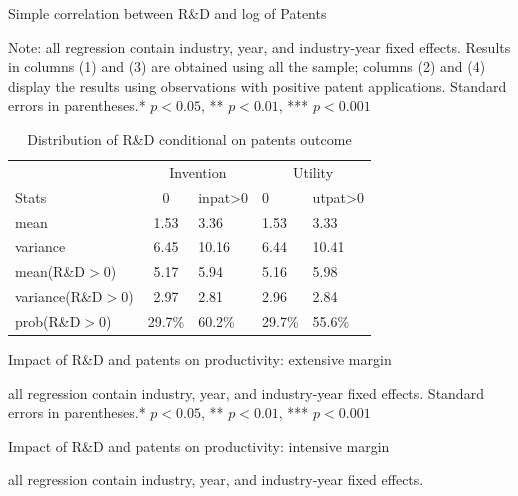 \documentclass[english]{article}
\begin{document}
\begin{table}[H]
\centering
\caption{Simple correlation between R\&D and log of Patents}
\label{T5B}

\caption*{\small{}Note: all regression contain industry, year, and industry-year fixed effects. Results in columns (1) and (3) are obtained using all the sample; columns (2) and (4) display the results using observations with positive patent applications. Standard errors in parentheses.{*} \(p<0.05\), {**} \(p<0.01\), {***} \(p<0.001\)} {\small \par}
\end{table}

\begin{table}[H]
\centering
\caption{Distribution of R\&D conditional on patents outcome}
\label{T6}
\begin{tabular}{lclll}
\hline\hline
                                & \multicolumn{2}{c}{Invention} & \multicolumn{2}{c}{Utility}   \\\cmidrule{2-5}
Stats                           & 0      & inpat\textgreater0 & 0      & utpat\textgreater0 \\
\hline\hline
mean                            & 1.53    & 3.36                & 1.53   & 3.33                \\
variance                  & 6.45    & 10.16               & 6.44   & 10.41               \\
mean(R\&D$>0$)           & 5.17    & 5.94                & 5.16   & 5.98                \\
variance(R\&D$>0$) & 2.97    & 2.81                & 2.96   & 2.84                \\
prob(R\&D$>0$)                            & 29.7\%  & 60.2\%              & 29.7\% & 55.6\%  \\
\hline\hline                 
\end{tabular}
\end{table}

\begin{table}[H]
\centering
\caption{Impact of R\&D and patents on productivity: extensive margin}
\label{T8}

\caption*{\small{}all regression contain industry, year, and industry-year fixed effects. Standard errors in parentheses.{*} \(p<0.05\), {**} \(p<0.01\), {***} \(p<0.001\)} {\small \par}
\end{table}

\begin{table}[H]
\centering
\caption{Impact of R\&D and patents on productivity: intensive margin}
\label{T9}

\caption*{\small{}all regression contain industry, year, and industry-year fixed effects. } {\small \par}
\end{table}
\end{document}
